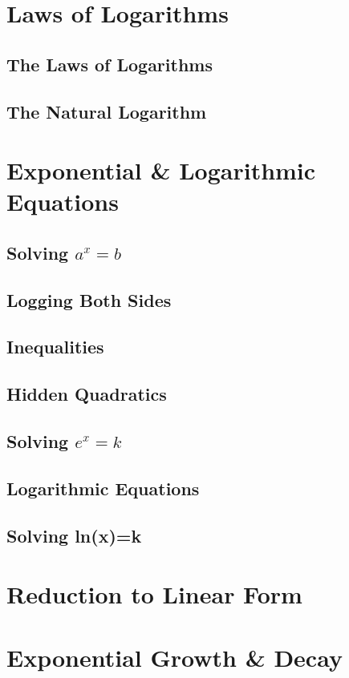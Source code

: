 \documentclass[../maths.tex]{subfiles}
\begin{document}
\section{Laws of Logarithms}
\subsection*{The Laws of Logarithms}
\subsection*{The Natural Logarithm}
\section{Exponential \& Logarithmic Equations}
\subsection*{Solving \texorpdfstring{$a^x=b$}{a to the x = b}}
\subsection*{Logging Both Sides}
\subsection*{Inequalities}
\subsection*{Hidden Quadratics}
\subsection*{Solving \texorpdfstring{$e^x=k$}{e to the x = k}}
\subsection*{Logarithmic Equations}
\subsection*{Solving ln(x)=k}
\section{Reduction to Linear Form}
\section{Exponential Growth \& Decay}
\end{document}
